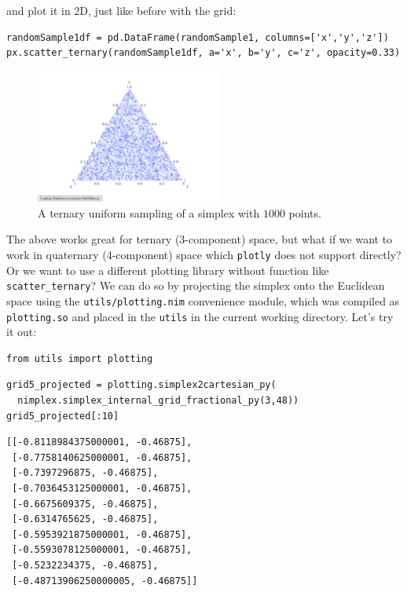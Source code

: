 and plot it in 2D, just like before with the grid:

\begin{verbatim}
randomSample1df = pd.DataFrame(randomSample1, columns=['x','y','z'])
px.scatter_ternary(randomSample1df, a='x', b='y', c='z', opacity=0.33)
\end{verbatim}

\begin{figure}[H]
    \centering
    \includegraphics[width=0.55\textwidth]{nimplexTutorial1/01.QuickStart_22_0.pdf}
    \caption{A ternary uniform sampling of a simplex with $1000$ points.}
    \label{nimplextutorial1:fig:ternaryuniformsampling}
\end{figure}

The above works great for ternary (3-component) space, but what if we
want to work in quaternary (4-component) space which
\texttt{plotly} does not support directly? Or we want
to use a different plotting library without function like
\texttt{scatter\_ternary}? We can do so by projecting
the simplex onto the Euclidean space using the
\texttt{utils/plotting.nim} convenience module, which
was compiled as \texttt{plotting.so} and placed in the
\texttt{utils} in the current working directory. Let's
try it out:

\begin{verbatim}
from utils import plotting
\end{verbatim}

\begin{verbatim}
grid5_projected = plotting.simplex2cartesian_py(
  nimplex.simplex_internal_grid_fractional_py(3,48))
grid5_projected[:10]
\end{verbatim}

\begin{verbatim}
[[-0.8118984375000001, -0.46875],
 [-0.7758140625000001, -0.46875],
 [-0.7397296875, -0.46875],
 [-0.7036453125000001, -0.46875],
 [-0.6675609375, -0.46875],
 [-0.6314765625, -0.46875],
 [-0.5953921875000001, -0.46875],
 [-0.5593078125000001, -0.46875],
 [-0.5232234375, -0.46875],
 [-0.48713906250000005, -0.46875]]
\end{verbatim}

